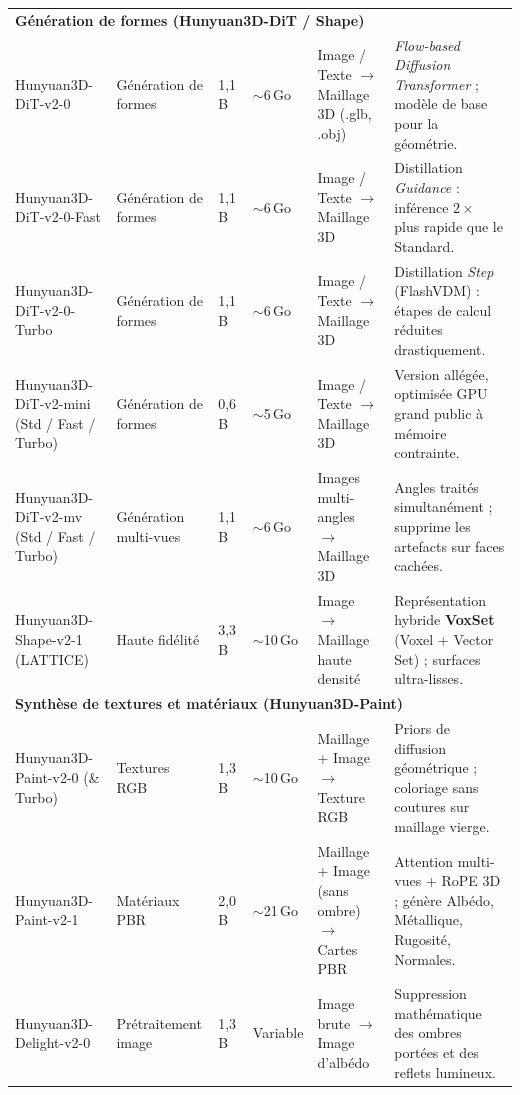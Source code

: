\documentclass[12pt,a4paper,oneside]{report}
\begin{document}
{\begin{longtable}{@{}p{3.5cm}p{1.6cm}p{1.0cm}p{1.0cm}p{2.8cm}p{3.5cm}@{}}
\multicolumn{6}{l}{\bfseries\color{tekupblue}%
  Génération de formes (Hunyuan3D-DiT / Shape)} \\[2pt]
Hunyuan3D-DiT-v2-0
  & Génération de formes & 1,1\,B & $\sim$6\,Go
  & Image / Texte $\rightarrow$ Maillage 3D (.glb, .obj)
  & \textit{Flow-based Diffusion Transformer} ; modèle de base pour la géométrie. \\[2pt]
Hunyuan3D-DiT-v2-0-Fast
  & Génération de formes & 1,1\,B & $\sim$6\,Go
  & Image / Texte $\rightarrow$ Maillage 3D
  & Distillation \textit{Guidance} : inférence $2\times$ plus rapide que le Standard. \\[2pt]
Hunyuan3D-DiT-v2-0-Turbo
  & Génération de formes & 1,1\,B & $\sim$6\,Go
  & Image / Texte $\rightarrow$ Maillage 3D
  & Distillation \textit{Step} (FlashVDM) : étapes de calcul réduites drastiquement. \\[2pt]
Hunyuan3D-DiT-v2-mini (Std / Fast / Turbo)
  & Génération de formes & 0,6\,B & $\sim$5\,Go
  & Image / Texte $\rightarrow$ Maillage 3D
  & Version allégée, optimisée GPU grand public à mémoire contrainte. \\[2pt]
Hunyuan3D-DiT-v2-mv (Std / Fast / Turbo)
  & Génération multi-vues & 1,1\,B & $\sim$6\,Go
  & Images multi-angles $\rightarrow$ Maillage 3D
  & Angles traités simultanément ; supprime les artefacts sur faces cachées. \\[2pt]
Hunyuan3D-Shape-v2-1 (LATTICE)
  & Haute fidélité & 3,3\,B & $\sim$10\,Go
  & Image $\rightarrow$ Maillage haute densité
  & Représentation hybride \textbf{VoxSet} (Voxel + Vector Set) ; surfaces ultra-lisses. \\[4pt]
\midrule

\multicolumn{6}{l}{\bfseries\color{tekupblue}%
  Synthèse de textures et matériaux (Hunyuan3D-Paint)} \\[2pt]
Hunyuan3D-Paint-v2-0 (\& Turbo)
  & Textures RGB & 1,3\,B & $\sim$10\,Go
  & Maillage + Image $\rightarrow$ Texture RGB
  & Priors de diffusion géométrique ; coloriage sans coutures sur maillage vierge. \\[2pt]
Hunyuan3D-Paint-v2-1
  & Matériaux PBR & 2,0\,B & $\sim$21\,Go
  & Maillage + Image (sans ombre) $\rightarrow$ Cartes PBR
  & Attention multi-vues + RoPE 3D ; génère Albédo, Métallique, Rugosité, Normales. \\[2pt]
Hunyuan3D-Delight-v2-0
  & Prétraite\-ment image & 1,3\,B & Variable
  & Image brute $\rightarrow$ Image d'albédo
  & Suppression mathématique des ombres portées et des reflets lumineux. \\[4pt]
\midrule


\end{longtable}}
\end{document}
